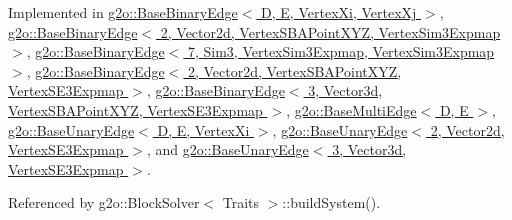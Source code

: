 Implemented in \hyperlink{classg2o_1_1BaseBinaryEdge_afc3b6470e7679f027c2614484b394925}{g2o\+::\+Base\+Binary\+Edge$<$ D, E, Vertex\+Xi, Vertex\+Xj $>$}, \hyperlink{classg2o_1_1BaseBinaryEdge_afc3b6470e7679f027c2614484b394925}{g2o\+::\+Base\+Binary\+Edge$<$ 2, Vector2d, Vertex\+S\+B\+A\+Point\+X\+Y\+Z, Vertex\+Sim3\+Expmap $>$}, \hyperlink{classg2o_1_1BaseBinaryEdge_afc3b6470e7679f027c2614484b394925}{g2o\+::\+Base\+Binary\+Edge$<$ 7, Sim3, Vertex\+Sim3\+Expmap, Vertex\+Sim3\+Expmap $>$}, \hyperlink{classg2o_1_1BaseBinaryEdge_afc3b6470e7679f027c2614484b394925}{g2o\+::\+Base\+Binary\+Edge$<$ 2, Vector2d, Vertex\+S\+B\+A\+Point\+X\+Y\+Z, Vertex\+S\+E3\+Expmap $>$}, \hyperlink{classg2o_1_1BaseBinaryEdge_afc3b6470e7679f027c2614484b394925}{g2o\+::\+Base\+Binary\+Edge$<$ 3, Vector3d, Vertex\+S\+B\+A\+Point\+X\+Y\+Z, Vertex\+S\+E3\+Expmap $>$}, \hyperlink{classg2o_1_1BaseMultiEdge_a72176776797987b8ae79ea2e33971e9e}{g2o\+::\+Base\+Multi\+Edge$<$ D, E $>$}, \hyperlink{classg2o_1_1BaseUnaryEdge_a8b396647b5b438d30a04758023baa595}{g2o\+::\+Base\+Unary\+Edge$<$ D, E, Vertex\+Xi $>$}, \hyperlink{classg2o_1_1BaseUnaryEdge_a8b396647b5b438d30a04758023baa595}{g2o\+::\+Base\+Unary\+Edge$<$ 2, Vector2d, Vertex\+S\+E3\+Expmap $>$}, and \hyperlink{classg2o_1_1BaseUnaryEdge_a8b396647b5b438d30a04758023baa595}{g2o\+::\+Base\+Unary\+Edge$<$ 3, Vector3d, Vertex\+S\+E3\+Expmap $>$}.



Referenced by g2o\+::\+Block\+Solver$<$ Traits $>$\+::build\+System().

